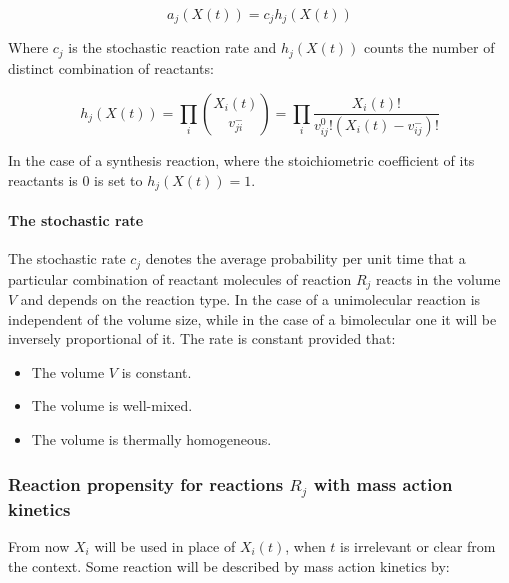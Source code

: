     $$a_j(X(t)) = c_jh_j(X(t))$$

    Where $c_j$ is the stochastic reaction rate and $h_j(X(t))$ counts the number of distinct combination of reactants:

    $$h_j(X(t)) = \prod\limits_i\binom{X_i(t)}{v_{ji}^-} = \prod\limits_i\frac{X_i(t)!}{v_{ij}^0!(X_i(t)-v_{ij}^-)!}$$

    In the case of a synthesis reaction, where the stoichiometric coefficient of its reactants is $0$ is set to $h_j(X(t)) = 1$.

      \paragraph{The stochastic rate}
      The stochastic rate $c_j$ denotes the average probability per unit time that a particular combination of reactant molecules of reaction $R_j$ reacts in the volume $V$ and depends on the reaction type.
      In the case of a unimolecular reaction is independent of the volume size, while in the case of a bimolecular one it will be inversely proportional of it.
      The rate is constant provided that:

      \begin{multicols}{2}
        \begin{itemize}
          \item The volume $V$ is constant.
          \item The volume is well-mixed.
          \item The volume is thermally homogeneous.
        \end{itemize}
      \end{multicols}

    \subsubsection{Reaction propensity for reactions $ R_j$ with mass action kinetics}
    From now $X_i$ will be used in place of $X_i(t)$, when $t$ is irrelevant or clear from the context.
    Some reaction will be described by mass action kinetics by:

